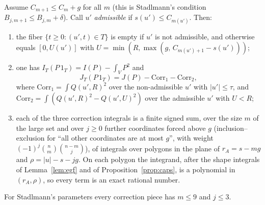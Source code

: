 \begin{proposition}\label{prop:exact}
Assume $C_{m+1}\le C_m+g$ for all $m$ (this is Stadlmann's condition
$B_{j,m+1}\le B_{j,m}+\delta$). Call $u'$ \emph{admissible} if $s(u')\le
C_{m(u')}$. Then:
\begin{enumerate}
\item the fiber $\{t\ge0:(u',t)\in T\}$ is empty if $u'$ is not admissible,
and otherwise equals $[0,U(u')]$ with
$U=\min\left(R,\max(g,\,C_{m(u')+1}-s(u'))\right)$;
\item one has $I_T(P\,1_T)=I(P)-\int_VP^2$ and
\[J_T(P\,1_T)=J(P)-\mathrm{Corr}_1-\mathrm{Corr}_2,\]
where
$\mathrm{Corr}_1=\int Q(u',R)^2$ over the non-admissible $u'$ with
$|u'|\le\tau$, and
$\mathrm{Corr}_2=\int\left(Q(u',R)^2-Q(u',U)^2\right)$ over the admissible $u'$ with $U<R$;
\item each of the three correction integrals is a finite signed sum, over the
size $m$ of the large set and over $j\ge0$ further coordinates forced above
$g$ (inclusion--exclusion for ``all other coordinates are at most $g$'', with
weight $(-1)^j\binom nm\binom{n-m}{j}$), of integrals over polygons in the
plane of $r_A=s-mg$ and $\rho=|u|-s-jg$. On each polygon the integrand,
after the shape integrals of Lemma~\ref{lem:egf} and of
Proposition~\ref{prop:caps}, is a polynomial in $(r_A,\rho)$, so every term
is an exact rational number.
\end{enumerate}
For Stadlmann's parameters every correction piece has $m\le9$ and $j\le3$.
\end{proposition}


